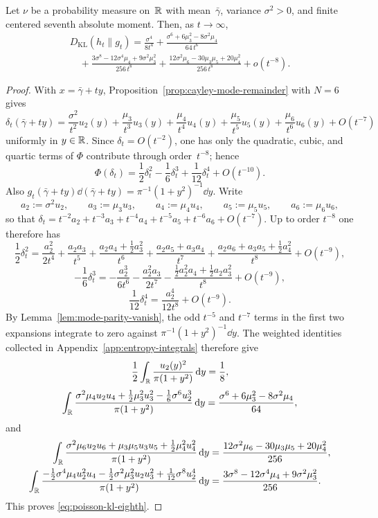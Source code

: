 \begin{theorem}%
\label{thm:poisson-kl-eighth}
Let $\nu$ be a probability measure on~$\mathbb{R}$ with mean~$\bar\gamma$,
variance $\sigma^2>0$, and finite centered seventh absolute moment.  Then,
as $t\to\infty$,
\begin{equation}\label{eq:poisson-kl-eighth}
\begin{split}
D_{\mathrm{KL}}(h_t\|g_t)
=\frac{\sigma^4}{8t^4}
+\frac{\sigma^6+6\mu_3^2-8\sigma^2\mu_4}{64\,t^6}
\\
\quad
+\frac{3\sigma^8-12\sigma^4\mu_4+9\sigma^2\mu_3^2}{256\,t^8}
+\frac{12\sigma^2\mu_6-30\mu_3\mu_5+20\mu_4^2}{256\,t^8}
+o(t^{-8}).
\end{split}
\end{equation}
\end{theorem}

\begin{proof}
With $x=\bar\gamma+ty$, Proposition~\ref{prop:cayley-mode-remainder} with
$N=6$ gives
\[
\delta_t(\bar\gamma+ty)
=\frac{\sigma^2}{t^2}u_2(y)
+\frac{\mu_3}{t^3}u_3(y)
+\frac{\mu_4}{t^4}u_4(y)
+\frac{\mu_5}{t^5}u_5(y)
+\frac{\mu_6}{t^6}u_6(y)
+O(t^{-7})
\]
uniformly in $y\in\mathbb{R}$.  Since $\delta_t=O(t^{-2})$, one has
only the quadratic, cubic, and quartic terms of $\Phi$ contribute
through order~$t^{-8}$; hence
\[
\Phi(\delta_t)
=\frac12\delta_t^2-\frac16\delta_t^3+\frac1{12}\delta_t^4+O(t^{-10}).
\]
Also $g_t(\bar\gamma+ty)\dd(\bar\gamma+ty)=\pi^{-1}(1+y^2)^{-1}\dd y$.
Write
\[
a_2:=\sigma^2u_2,\qquad a_3:=\mu_3u_3,\qquad a_4:=\mu_4u_4,
\qquad a_5:=\mu_5u_5,\qquad a_6:=\mu_6u_6,
\]
so that $\delta_t=t^{-2}a_2+t^{-3}a_3+t^{-4}a_4+t^{-5}a_5+t^{-6}a_6+O(t^{-7})$.
Up to order $t^{-8}$ one therefore has
\[
\frac12\delta_t^2
=\frac{a_2^2}{2t^4}
+\frac{a_2a_3}{t^5}
+\frac{a_2a_4+\frac12 a_3^2}{t^6}
+\frac{a_2a_5+a_3a_4}{t^7}
+\frac{a_2a_6+a_3a_5+\frac12 a_4^2}{t^8}
+O(t^{-9}),
\]
\[
-\frac16\delta_t^3
=-\frac{a_2^3}{6t^6}
-\frac{a_2^2a_3}{2t^7}
-\frac{\frac12 a_2^2a_4+\frac12 a_2a_3^2}{t^8}
+O(t^{-9}),
\]
\[
\frac1{12}\delta_t^4
=\frac{a_2^4}{12t^8}+O(t^{-9}).
\]
By Lemma~\ref{lem:mode-parity-vanish}, the odd $t^{-5}$ and $t^{-7}$
terms in the first two expansions integrate to zero against
$\pi^{-1}(1+y^2)^{-1}\dd y$.  The weighted identities collected in
Appendix~\ref{app:entropy-integrals} therefore give
\[
\frac12\int_{\mathbb{R}}\frac{u_2(y)^2}{\pi(1+y^2)}\,\mathrm{d} y=\frac18,
\]
\[
\int_{\mathbb{R}}\frac{\sigma^2\mu_4u_2u_4+\frac12\mu_3^2u_3^2-\frac16\sigma^6u_2^3}
{\pi(1+y^2)}\,\mathrm{d} y
=\frac{\sigma^6+6\mu_3^2-8\sigma^2\mu_4}{64},
\]
and
\begin{align*}
\int_{\mathbb{R}}
\frac{\sigma^2\mu_6u_2u_6+\mu_3\mu_5u_3u_5+\frac12\mu_4^2u_4^2}
{\pi(1+y^2)}\,\mathrm{d} y
&=\frac{12\sigma^2\mu_6-30\mu_3\mu_5+20\mu_4^2}{256},
\\
\int_{\mathbb{R}}
\frac{-\frac12\sigma^4\mu_4u_2^2u_4-\frac12\sigma^2\mu_3^2u_2u_3^2
+\frac1{12}\sigma^8u_2^4}{\pi(1+y^2)}\,\mathrm{d} y
&=\frac{3\sigma^8-12\sigma^4\mu_4+9\sigma^2\mu_3^2}{256}.
\end{align*}
This proves \eqref{eq:poisson-kl-eighth}.
\end{proof}

